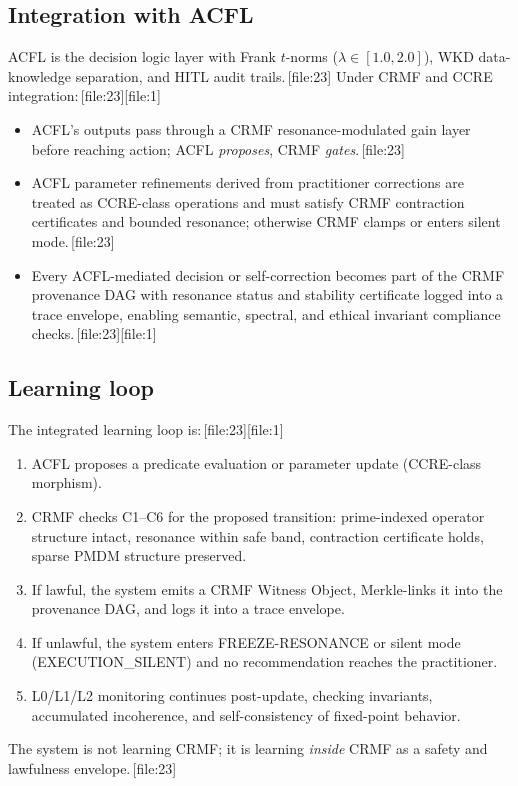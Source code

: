 \documentclass[11pt]{article}
\begin{document}
\subsection{Integration with ACFL}

ACFL is the decision logic layer with Frank $t$-norms ($\lambda\in[1.0,2.0]$), WKD data-knowledge separation, and HITL audit trails.\,[file:23]
Under CRMF and CCRE integration:\,[file:23][file:1]
\begin{itemize}[leftmargin=1.5em]
  \item ACFL's outputs pass through a CRMF resonance-modulated gain layer before reaching action; ACFL \emph{proposes}, CRMF \emph{gates}.\,[file:23]
  \item ACFL parameter refinements derived from practitioner corrections are treated as CCRE-class operations and must satisfy CRMF contraction certificates and bounded resonance; otherwise CRMF clamps or enters silent mode.\,[file:23]
  \item Every ACFL-mediated decision or self-correction becomes part of the CRMF provenance DAG with resonance status and stability certificate logged into a trace envelope, enabling semantic, spectral, and ethical invariant compliance checks.\,[file:23][file:1]
\end{itemize}

\subsection{Learning loop}

The integrated learning loop is:\,[file:23][file:1]
\begin{enumerate}[leftmargin=1.5em]
  \item ACFL proposes a predicate evaluation or parameter update (CCRE-class morphism).
  \item CRMF checks C1--C6 for the proposed transition: prime-indexed operator structure intact, resonance within safe band, contraction certificate holds, sparse PMDM structure preserved.
  \item If lawful, the system emits a CRMF Witness Object, Merkle-links it into the provenance DAG, and logs it into a trace envelope.
  \item If unlawful, the system enters FREEZE-RESONANCE or silent mode (EXECUTION\_SILENT) and no recommendation reaches the practitioner.
  \item L0/L1/L2 monitoring continues post-update, checking invariants, accumulated incoherence, and self-consistency of fixed-point behavior.
\end{enumerate}
The system is not learning CRMF; it is learning \emph{inside} CRMF as a safety and lawfulness envelope.\,[file:23]
\end{document}
